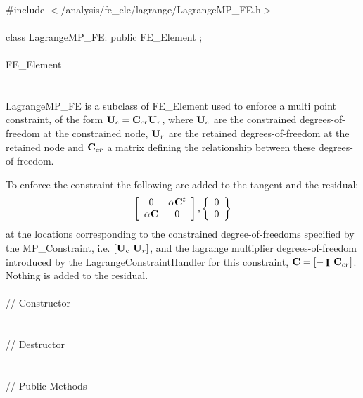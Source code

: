 
   \\
\indent \#include $<\tilde{ }$/analysis/fe\_ele/lagrange/LagrangeMP\_FE.h$>$  \\

  \\
\indent class LagrangeMP\_FE: public FE\_Element ;  \\

  \\
\indent FE\_Element \\
\indent{} \\ 

  \\
\indent LagrangeMP\_FE is a subclass of FE\_Element used to enforce a
multi point constraint, of the form ${\bf U}_c = {\bf C}_{cr} {\bf U}_r$, where ${\bf U}_c$ are
the constrained degrees-of-freedom at the constrained node, ${\bf U}_r$ are
the retained degrees-of-freedom at the retained node and ${\bf C}_{cr}$ a
matrix defining the relationship between these degrees-of-freedom. 

To enforce the constraint the following are added to the tangent and
the residual:
\[ \left[ \begin{array}{cc} 0 & \alpha{\bf C}^t \\ \alpha{\bf C} & 0 \end{array}
\right] ,
\left\{ \begin{array}{c} 0 \\ 0 \end{array} \right\} \]
\noindent 
\noindent at the locations
corresponding to the constrained degree-of-freedoms specified by the
MP\_Constraint, i.e. $[{\bf U}_c$ ${\bf U}_r]$, and the lagrange multiplier
degrees-of-freedom introduced by the LagrangeConstraintHandler for
this constraint, ${\bf C} = [-\mathop{\cal {\bf I}}$ ${\bf C}_{cr}]$. Nothing is added to the residual. \\  


  \\
\indent // Constructor  \\
 \\ \\
\indent // Destructor  \\
  \\ \\
\indent // Public Methods \\
 \\ 
 \\  
 \\  
\\

